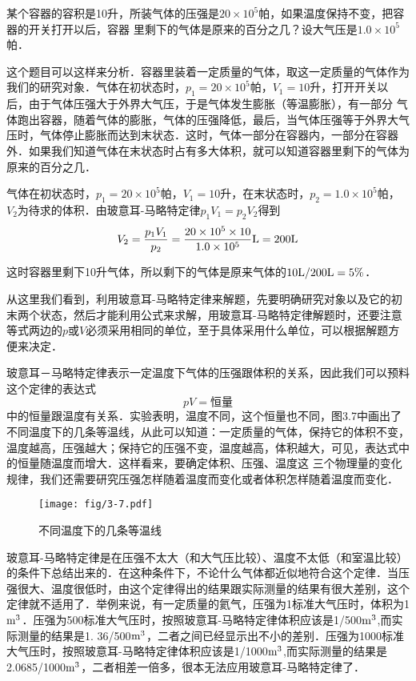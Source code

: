 \begin{example}
某个容器的容积是10升，所装气体的压强是$20\times 10^5$帕，如果温度保持不变，把容器的开关打开以后，容器
里剩下的气体是原来的百分之几？设大气压是$1.0\times 10^5$帕．
\end{example}

\begin{solution}
这个题目可以这样来分析．容器里装着一定质量的气体，取这一定质量的气体作为我们的研究对象．气体在初状态时，$p_1=20\times 10^5$帕，$V_1=10$升，打开开关以后，由于气体压强大于外界大气压，于是气体发生膨胀（等温膨胀），有一部分
气体跑出容器，随着气体的膨胀，气体的压强降低，最后，当气体压强等于外界大气压时，气体停止膨胀而达到末状态．这时，气体一部分在容器内，一部分在容器外．如果我们知道气体在末状态时占有多大体积，就可以知道容器里剩下的气体为原来的百分之几．

气体在初状态时，$p_1=20\times 10^5$帕，$V_1=10$升，在末状态时，$p_2=1.0\times 10^5$帕，$V_2$为待求的体积．由玻意耳-马略特定律$p_1V_1=p_2V_2$得到
\[V_2=\frac{p_1V_1}{p_2}=\frac{20\times 10^5\times 10}{1.0\times 10^5}{\rm L}=200{\rm L} \]

这时容器里剩下10升气体，所以剩下的气体是原来气体的$10{\rm L}/200{\rm L}=5\%$．
\end{solution}

从这里我们看到，利用玻意耳-马略特定律来解题，先要明确研究对象以及它的初末两个状态，然后才能利用公式来求解，用玻意耳-马略特定律解题时，还要注意等式两边的$p$或$V$必须采用相同的单位，至于具体采用什么单位，可以根据解题方便来决定．

玻意耳－马略特定律表示一定温度下气体的压强跟体积的关系，因此我们可以预料这个定律的表达式
\[pV=\text{恒量} \]
中的恒量跟温度有关系．实验表明，温度不同，这个恒量也不同，图3.7中画出了不同温度下的几条等温线，从此可以知道：一定质量的气体，保持它的体积不变，温度越高，压强越大；保持它的压强不变，温度越高，体积越大，可见，表达式中的恒量随温度而增大．这样看来，要确定体积、压强、温度这
三个物理量的变化规律，我们还需要研究压强怎样随着温度而变化或者体积怎样随着温度而变化．
\begin{figure}[htp]\centering
	\texttt{[image: fig/3-7.pdf]}
	\caption{不同温度下的几条等温线}
\end{figure}



玻意耳-马略特定律是在压强不太大（和大气压比较）、温度不太低（和室温比较）的条件下总结出来的．在这种条件下，不论什么气体都近似地符合这个定律．当压强很大、温度很低时，由这个定律得出的结果跟实际测量的结果有很大差别，这个定律就不适用了．举例来说，有一定质量的氦气，压强为1标准大气压时，体积为1${\rm m^3}$．压强为500标准大气压时，按照玻意耳-马略特定律体积应该是1/500${\rm m^3}$,而实际测量的结果是1. 36/500${\rm m^3}$，二者之间已经显示出不小的差别．压强为1000标准大气压时，按照玻意耳-马略特定律体积应该是1/1000${\rm m^3}$,而实际测量的结果是2.0685/1000${\rm m^3}$，二者相差一倍多，很本无法应用玻意耳-马略特定律了．



